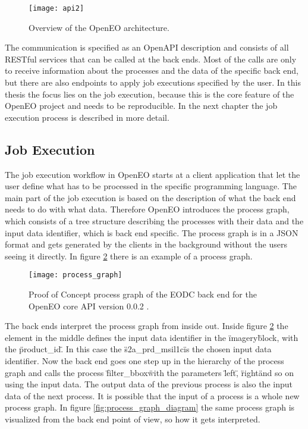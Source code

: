 \documentclass[draft,final]{vutinfth} %
\begin{document}
\begin{figure}[h]
	\centering
	\texttt{[image: api2]}
	\caption{Overview of the OpenEO architecture. \cite{openeo}}
	\label{fig:api2} %
\end{figure}


The communication is specified as an OpenAPI description and consists of all RESTful services that can be called at the back ends. Most of the calls are only to receive information about the processes and the data of the specific back end, but there are also endpoints to apply job executions specified by the user. In this thesis the focus lies on the job execution, because this is the core feature of the OpenEO project and needs to be reproducible. In the next chapter the job execution process is described in more detail. \cite{openeo}

\subsection{Job Execution}\label{Job Execution}
The job execution workflow in OpenEO starts at a client application that let the user define what has to be processed in the specific programming language.
The main part of the job execution is based on the description of what the back end needs to do with what data. Therefore OpenEO introduces the process graph, which consists of a tree structure describing the processes with their data and the input data identifier, which is back end specific. The process graph is in a JSON format and gets generated by the clients in the background without the users seeing it directly. In figure \ref{fig:process_graph} there is an example of a process graph. 

\begin{figure}[h]
	\centering
	\texttt{[image: process\_graph]}
	\caption{Proof of Concept process graph of the EODC back end for the OpenEO core API version 0.0.2 . \cite{openeo}}
	\label{fig:process_graph} %
\end{figure}

The back ends interpret the process graph from inside out. Inside figure \ref{fig:process_graph} the element in the middle defines the input data identifier in the \"imagery\" block, with the \"product\_id\". In this case the \"s2a\_prd\_msil1c\" is the chosen input data identifier. Now the back end goes one step up in the hierarchy of the process graph and calls the process \"filter\_bbox\" with the parameters \"left\", \"right\" and so on using the input data. The output data of the previous process is also the input data of the next process. It is possible that the input of a process is a whole new process graph. In figure \ref{fig:process_graph_diagram} the same process graph is visualized from the back end point of view, so how it gets interpreted. 
\end{document}
